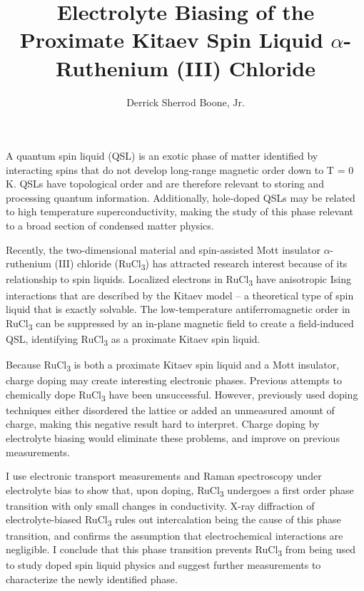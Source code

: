 \documentclass[12pt]{report}
\title{Electrolyte Biasing of the Proximate Kitaev Spin Liquid $\alpha$-Ruthenium (III) Chloride}
\author{Derrick Sherrod Boone, Jr.}
\newcommand{\rucl}{RuCl\textsubscript{3} }
\newcommand{\ruclnospace}{RuCl\textsubscript{3}}
\begin{document}

    \beforepreface


A quantum spin liquid (QSL) is an exotic phase of matter identified by interacting spins that do not develop long-range magnetic order down to T = 0 K. QSLs have topological order and are therefore relevant to storing and processing quantum information. Additionally, hole-doped QSLs may be related to high temperature superconductivity, making the study of this phase relevant to a broad section of condensed matter physics.

Recently, the two-dimensional material and spin-assisted Mott insulator $\alpha$-ruthenium (III) chloride (\ruclnospace) has attracted research interest because of its relationship to spin liquids. Localized electrons in \rucl have anisotropic Ising interactions that are described by the Kitaev model – a theoretical type of spin liquid that is exactly solvable. The low-temperature antiferromagnetic order in \rucl can be suppressed by an in-plane magnetic field to create a field-induced QSL, identifying \rucl as a proximate Kitaev spin liquid.

Because \rucl is both a proximate Kitaev spin liquid and a Mott insulator, charge doping may create interesting electronic phases. Previous attempts to chemically dope \rucl have been unsuccessful. However, previously used doping techniques either disordered the lattice or added an unmeasured amount of charge, making this negative result hard to interpret. Charge doping by electrolyte biasing would eliminate these problems, and improve on previous measurements.

I use electronic transport measurements and Raman spectroscopy under electrolyte bias to show that, upon doping, \rucl undergoes a first order phase transition with only small changes in conductivity. X-ray diffraction of electrolyte-biased \rucl rules out intercalation being the cause of this phase transition, and confirms the assumption that electrochemical interactions are negligible. I conclude that this phase transition prevents \rucl from being used to study doped spin liquid physics and suggest further measurements to characterize the newly identified phase.
\end{document}
